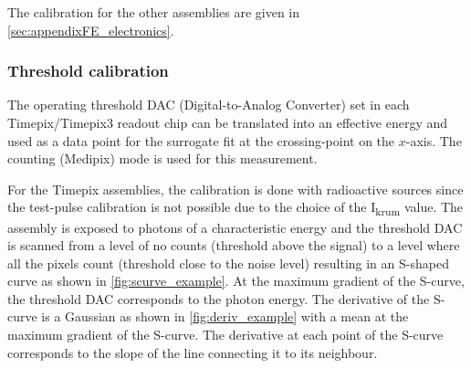 The calibration for the other assemblies are given in \cref{sec:appendixFE_electronics}.


\subsubsection{Threshold calibration} \label{sec:threshold}


The operating threshold DAC (Digital-to-Analog Converter) set in each
Timepix/Timepix3 readout chip can be translated into an effective
energy and used as a data point for the surrogate fit at the
crossing-point on the $x$-axis. The counting (Medipix) mode is used
for this measurement.  

For the Timepix assemblies, the calibration is done with radioactive
sources since the test-pulse calibration is not possible due to the
choice of the I\textsubscript{krum} value. The assembly is exposed to
photons of a characteristic energy and the threshold DAC is scanned
from a level of no counts (threshold above the signal) to a level
where all the pixels count (threshold close to the noise level)
resulting in an S-shaped curve as shown in
\cref{fig:scurve_example}. At the maximum gradient of the S-curve, the
threshold DAC corresponds to the photon energy. The derivative of the
S-curve is a Gaussian as shown in \cref{fig:deriv_example} with a mean
at the maximum gradient of the S-curve. The derivative at each point
of the S-curve corresponds to the slope of the line connecting it to
its neighbour.

